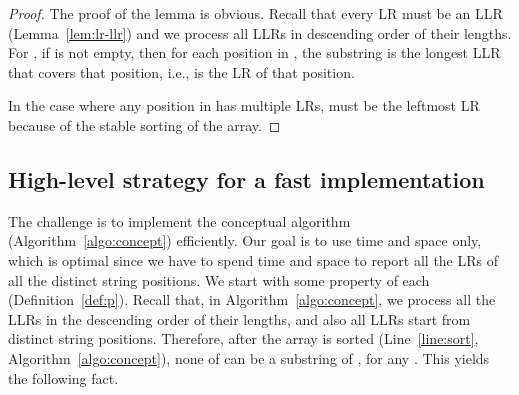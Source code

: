 \documentclass[preprint]{elsarticle}
\newcommand{\remove}[1]{}
\begin{document}
\begin{proof}
\remove{
  We prove the lemma by induction. 
  We first assume every string
  position has at most one LR and will deal with the case where one
  position can be possibly covered by multiple LRs in the end of the
  proof. 
}
The proof of the lemma is obvious. 
Recall that every LR must be an LLR (Lemma~\ref{lem:lr-llr}) and we
process all LLRs in descending order of their lengths.
For , if  is not empty, 
then for each position in , 
the  substring  is the
longest LLR that covers that position,
i.e.,  is the LR of
that position. 
\remove{
  Base case: We
  first observe that  is the longest repeat among
  , unless every string position in 
  contains a singleton. Therefore,   is the LR of every position in .

  Let's assume the conceptual algorithm produces correct LRs for
  positions that are covered by .  We will
  then show that it will produce correct LRs for positions that
  are covered by  but are not covered by
  . For the purpose of proof based on
  contradiction, we assume that  is
  not an LR for all those positions that are not covered by  but are covered by , then this implies
there exists at lease one position  of those positions, such that 
 is covered by an LR that is longer than .
From Lemma~\ref{lem:lr-llr}, we know that longer LR is also
  an LLR. Because we are processing LLRs in non-increasing order, 
  that longer LLR should appear before . This contradicts
  with the fact that position  is not covered by
  . So,  is the LR of those
  positions that are covered by  but are not covered
  by . 
}
In the case where any position in 
  has multiple LRs,  must be the leftmost LR because
  of the stable sorting of the  array. 
\end{proof}




\subsection{High-level strategy for a fast implementation}
\label{subsec:table}
The challenge is to implement the conceptual algorithm
(Algorithm~\ref{algo:concept}) efficiently. Our goal is to use 
time and space only, which is optimal since we have to spend 
time and space to report all the LRs of all the  distinct string
positions.
We start with some property of each  (Definition~\ref{def:p}).
Recall that, in Algorithm~\ref{algo:concept}, we process all the LLRs
in the descending order of their lengths, and also all LLRs start from
distinct string positions. Therefore, after the  array is
sorted (Line~\ref{line:sort}, Algorithm~\ref{algo:concept}),
none of
 can be a substring of ,  for any . This yields the following fact.
\end{document}
